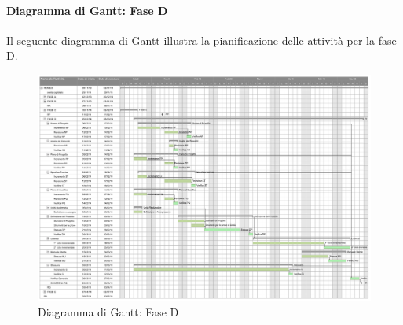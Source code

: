 \paragraph{Diagramma di Gantt: Fase D }
\label{DiagrammaCodifica}
Il seguente diagramma di Gantt\g{} illustra la pianificazione delle attività per la fase D.
\begin{figure}[h]
	\centering
	\includegraphics[width=1.2\textwidth]{./content/Immagini/faseD.png}
	\caption{Diagramma di Gantt: Fase D}
\end{figure}
\pagebreak
